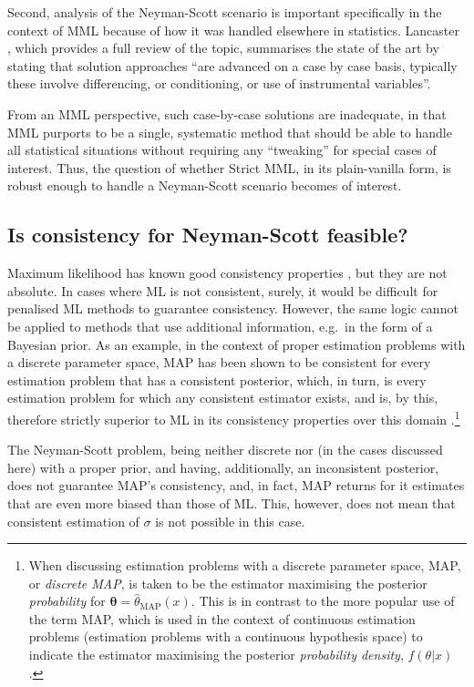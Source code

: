 \documentclass{IEEEtran}
\newcommand{\citep}[1]{\cite{#1}}
\begin{document}
Second, analysis of the Neyman-Scott scenario is important specifically in
the context of MML because of how it was handled elsewhere in statistics.
Lancaster \citep{lancaster2000incidental}, which provides a full review
of the topic, summarises the state of the art by stating that solution
approaches ``are advanced on a case by case basis, typically these involve
differencing, or conditioning, or use of instrumental variables''.

From an MML perspective, such case-by-case solutions are inadequate,
in that MML purports to be a single,
systematic method that should be able to handle all statistical situations
without requiring any ``tweaking'' for special cases of interest.
Thus, the question of whether Strict MML, in its plain-vanilla form, is
robust enough to handle a Neyman-Scott scenario becomes of interest.

\subsection{Is consistency for Neyman-Scott feasible?}

Maximum likelihood has known good consistency properties
\citep{Doob1934,Wald1949,Perlman1972,SeoLindsay2013}, but they are not
absolute. In cases where ML is not consistent, surely, it would be difficult
for penalised ML methods to guarantee consistency. However, the same
logic cannot be applied to methods that use additional information, e.g.\ in
the form of a Bayesian prior. As an example, in the context of proper estimation
problems with a discrete parameter space, MAP has been shown to be consistent
for every estimation problem that has a consistent posterior, which, in turn,
is every estimation problem for which any consistent estimator exists, and
is, by this, therefore strictly superior to ML in its consistency properties
over this domain \citep{Hendrey2019hierarchy}.\footnote{When discussing
estimation problems with a discrete parameter space, MAP, or
\emph{discrete MAP}, is taken to be the estimator maximising the posterior
\emph{probability} for $\boldsymbol{\theta}=\hat{\theta}_{\text{MAP}}(x)$. This
is in contrast to the more popular use of the term MAP, which is used in the
context of continuous estimation problems (estimation problems with a
continuous hypothesis space) to indicate the estimator
maximising the posterior \emph{probability density},
$f(\theta|x)$.}

The Neyman-Scott problem, being neither discrete nor (in the cases discussed
here) with a proper prior, and having, additionally, an inconsistent
posterior, does not guarantee MAP's consistency, and, in fact, MAP returns for
it estimates that are even more biased than those of ML. This, however,
does not mean that consistent estimation of $\sigma$ is not possible
in this case.
\end{document}
